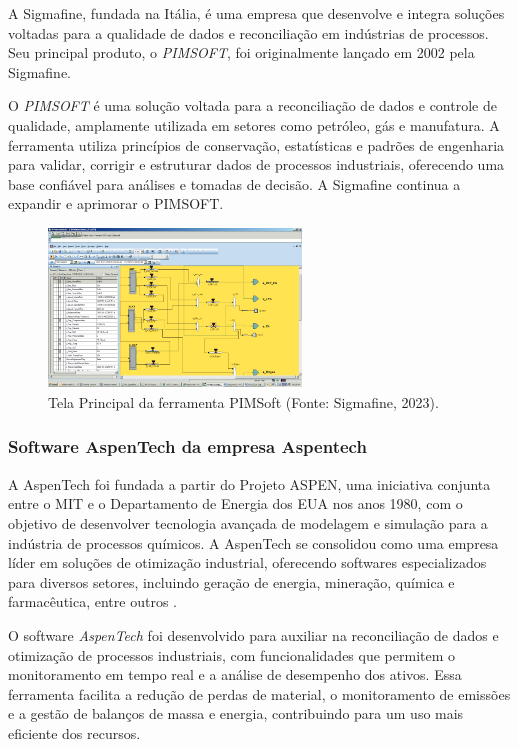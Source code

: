 A Sigmafine, fundada na Itália, é uma empresa que desenvolve e integra soluções voltadas para a qualidade de dados e reconciliação em indústrias de processos. Seu principal produto, o \textit{PIMSOFT}, foi originalmente lançado em 2002 pela Sigmafine.

O \textit{PIMSOFT} é uma solução voltada para a reconciliação de dados e controle de qualidade, amplamente utilizada em setores como petróleo, gás e manufatura. A ferramenta utiliza princípios de conservação, estatísticas e padrões de engenharia para validar, corrigir e estruturar dados de processos industriais, oferecendo uma base confiável para análises e tomadas de decisão. A Sigmafine continua a expandir e aprimorar o PIMSOFT.

\begin{figure}[htbp!] 
    \centering
    \includegraphics[width=0.6\textwidth]{figuras/sigmafine-pimsoft.png}
    \caption{Tela Principal da ferramenta PIMSoft (Fonte: Sigmafine, 2023).}
    \label{fig:Sigmafine}
\end{figure}

\subsubsection{Software AspenTech da empresa Aspentech}

A AspenTech foi fundada a partir do Projeto ASPEN, uma iniciativa conjunta entre o MIT e o Departamento de Energia dos EUA nos anos 1980, com o objetivo de desenvolver tecnologia avançada de modelagem e simulação para a indústria de processos químicos. A AspenTech se consolidou como uma empresa líder em soluções de otimização industrial, oferecendo softwares especializados para diversos setores, incluindo geração de energia, mineração, química e farmacêutica, entre outros \cite{aspen}.

O software \textit{AspenTech} foi desenvolvido para auxiliar na reconciliação de dados e otimização de processos industriais, com funcionalidades que permitem o monitoramento em tempo real e a análise de desempenho dos ativos. Essa ferramenta facilita a redução de perdas de material, o monitoramento de emissões e a gestão de balanços de massa e energia, contribuindo para um uso mais eficiente dos recursos.

